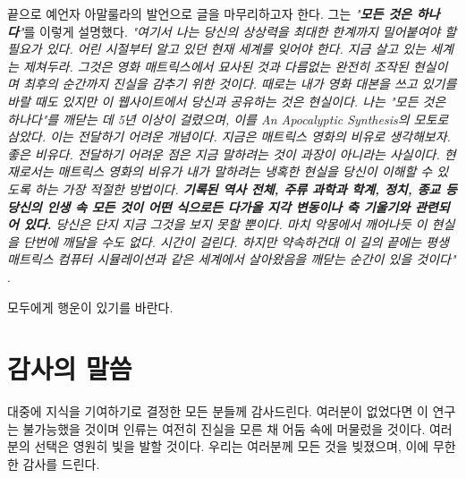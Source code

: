 \documentclass[10pt,twocolumn,letterpaper]{article}
\begin{document}
끝으로 예언자 아말룰라의 발언으로 글을 마무리하고자 한다. 그는 \textit{"\textbf{모든 것은 하나다}"}를 이렇게 설명했다. \textit{"여기서 나는 당신의 상상력을 최대한 한계까지 밀어붙여야 할 필요가 있다. 어린 시절부터 알고 있던 현재 세계를 잊어야 한다. 지금 살고 있는 세계는 제쳐두라. 그것은 영화 매트릭스에서 묘사된 것과 다름없는 완전히 조작된 현실이며 최후의 순간까지 진실을 감추기 위한 것이다. 때로는 내가 영화 대본을 쓰고 있기를 바랄 때도 있지만 이 웹사이트에서 당신과 공유하는 것은 현실이다. 나는 "모든 것은 하나다"를 깨닫는 데 5년 이상이 걸렸으며, 이를 An Apocalyptic Synthesis의 모토로 삼았다. 이는 전달하기 어려운 개념이다. 지금은 매트릭스 영화의 비유로 생각해보자. 좋은 비유다. 전달하기 어려운 점은 지금 말하려는 것이 과장이 아니라는 사실이다. 현재로서는 매트릭스 영화의 비유가 내가 말하려는 냉혹한 현실을 당신이 이해할 수 있도록 하는 가장 적절한 방법이다. \textbf{기록된 역사 전체, 주류 과학과 학계, 정치, 종교 등 당신의 인생 속 모든 것이 어떤 식으로든 다가올 지각 변동이나 축 기울기와 관련되어 있다.} 당신은 단지 지금 그것을 보지 못할 뿐이다. 마치 악몽에서 깨어나듯 이 현실을 단번에 깨달을 수도 없다. 시간이 걸린다. 하지만 약속하건대 이 길의 끝에는 평생 매트릭스 컴퓨터 시뮬레이션과 같은 세계에서 살아왔음을 깨닫는 순간이 있을 것이다"} \cite{33,34}.

모두에게 행운이 있기를 바란다. 

\section{감사의 말씀}

대중에 지식을 기여하기로 결정한 모든 분들께 감사드린다. 여러분이 없었다면 이 연구는 불가능했을 것이며 인류는 여전히 진실을 모른 채 어둠 속에 머물렀을 것이다. 여러분의 선택은 영원히 빛을 발할 것이다. 우리는 여러분께 모든 것을 빚졌으며, 이에 무한한 감사를 드린다.

\clearpage
\twocolumn

{\small
\renewcommand{\refname}{참고문헌}


}
\end{document}
